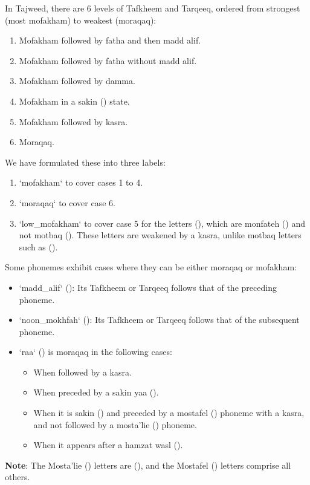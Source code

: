 In Tajweed, there are 6 levels of Tafkheem and Tarqeeq, ordered from strongest (most mofakham) to weakest (moraqaq):

\begin{enumerate}
\item Mofakham followed by fatha and then madd alif.
\item Mofakham followed by fatha without madd alif.
\item Mofakham followed by damma.
\item Mofakham in a sakin () state.
\item Mofakham followed by kasra.
\item Moraqaq.
\end{enumerate}

We have formulated these into three labels:

\begin{enumerate}
\item `mofakham` to cover cases 1 to 4.
\item `moraqaq` to cover case 6.
\item `low_mofakham` to cover case 5 for the letters (), which are monfateh () and not motbaq (). These letters are weakened by a kasra, unlike motbaq letters such as ().
\end{enumerate}

Some phonemes exhibit cases where they can be either moraqaq or mofakham:

\begin{itemize}
\item `madd_alif` (): Its Tafkheem or Tarqeeq follows that of the preceding phoneme.
\item `noon_mokhfah` (): Its Tafkheem or Tarqeeq follows that of the subsequent phoneme.
\item `raa` () is moraqaq in the following cases:
\begin{itemize}
    \item When followed by a kasra.
    \item When preceded by a sakin yaa ().
    \item When it is sakin () and preceded by a mostafel () phoneme with a kasra, and not followed by a mosta'lie () phoneme.
    \item When it appears after a hamzat wasl ().
\end{itemize}
\end{itemize}

\textbf{Note}: The Mosta'lie () letters are (), and the Mostafel () letters comprise all others.